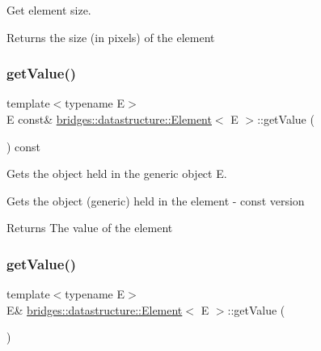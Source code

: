 Get element size. 

\begin{DoxyReturn}{Returns}
the size (in pixels) of the element 
\end{DoxyReturn}
\mbox{\label{classbridges_1_1datastructure_1_1_element_acf6e068c6b00ff0d20ed42af32ff1f38}} 
\subsubsection{\texorpdfstring{get\+Value()}{getValue()}\hspace{0.1cm}{\footnotesize\ttfamily [1/2]}}
{\footnotesize\ttfamily template$<$typename E$>$ \\
E const\& \hyperlink{classbridges_1_1datastructure_1_1_element}{bridges\+::datastructure\+::\+Element}$<$ E $>$\+::get\+Value (\begin{DoxyParamCaption}{ }\end{DoxyParamCaption}) const\hspace{0.3cm}{\ttfamily [inline]}}



Gets the object held in the generic object E. 

Gets the object (generic) held in the element -\/ const version \begin{DoxyReturn}{Returns}
The value of the element 
\end{DoxyReturn}
\mbox{\label{classbridges_1_1datastructure_1_1_element_abba0b4c03eb6fd08aed17eeb3be5bd1b}} 
\subsubsection{\texorpdfstring{get\+Value()}{getValue()}\hspace{0.1cm}{\footnotesize\ttfamily [2/2]}}
{\footnotesize\ttfamily template$<$typename E$>$ \\
E\& \hyperlink{classbridges_1_1datastructure_1_1_element}{bridges\+::datastructure\+::\+Element}$<$ E $>$\+::get\+Value (\begin{DoxyParamCaption}{ }\end{DoxyParamCaption})\hspace{0.3cm}{\ttfamily [inline]}}



